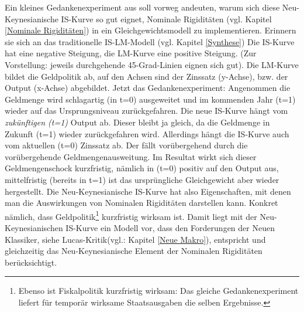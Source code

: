 Ein kleines Gedankenexperiment aus \textcite[S. 243]{Romer2019} soll vorweg andeuten, warum sich diese Neu-Keynesianische IS-Kurve so gut eignet, Nominale Rigiditäten (vgl. Kapitel \ref{Nominale Rigiditäten}) in ein Gleichgewichtsmodell zu implementieren. Erinnern sie sich an das traditionelle IS-LM-Modell (vgl. Kapitel \ref{Synthese}) Die IS-Kurve hat eine negative Steigung, die LM-Kurve eine positive Steigung. (Zur Vorstellung: jeweils durchgehende 45-Grad-Linien eignen sich gut). Die LM-Kurve bildet die Geldpolitik ab, auf den Achsen sind der Zinssatz (y-Achse), bzw. der Output (x-Achse) abgebildet. Jetzt das Gedankenexperiment: Angenommen die Geldmenge wird schlagartig (in t=0) ausgeweitet und im kommenden Jahr (t=1) wieder auf das Ursprungsniveau zurückgefahren. Die neue IS-Kurve hängt vom \textit{zukünftigen (t=1)} Output ab. Dieser bleibt ja gleich, da die Geldmenge in Zukunft (t=1) wieder zurückgefahren wird. Allerdings hängt die IS-Kurve auch vom aktuellen (t=0) Zinssatz ab. Der fällt vorübergehend durch die vorübergehende Geldmengenausweitung. Im Resultat wirkt sich dieser Geldmengenschock kurzfristig, nämlich in (t=0) positiv auf den Output aus, mittelfristig (bereits in t=1) ist das ursprüngliche Gleichgewicht aber wieder hergestellt. Die Neu-Keynesianische IS-Kurve hat also Eigenschaften, mit denen man die Auswirkungen von Nominalen Rigiditäten darstellen kann. Konkret nämlich, dass Geldpolitik\footnote{Ebenso ist Fiskalpolitik kurzfristig wirksam: Das gleiche Gedankenexperiment liefert für temporär wirksame Staatsausgaben die selben Ergebnisse.} kurzfristig wirksam ist. Damit liegt mit der Neu-Keynesianischen IS-Kurve ein Modell vor, dass den Forderungen der Neuen Klassiker, siehe Lucas-Kritik(vgl.: Kapitel \ref{Neue Makro}), entspricht und gleichzeitig das Neu-Keynesianische Element der Nominalen Rigiditäten berücksichtigt.

